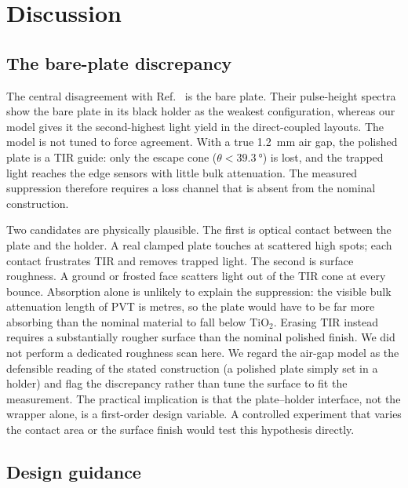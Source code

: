 \documentclass[preprint,12pt]{elsarticle}
\begin{document}
\section{Discussion}
\label{sec:discussion}

\subsection{The bare-plate discrepancy}

The central disagreement with Ref.~\cite{Rao2025} is the bare plate. Their
pulse-height spectra show the bare plate in its black holder as the weakest
configuration, whereas our model gives it the second-highest light yield in the
direct-coupled layouts. The model is not tuned to force agreement. With a true
\SI{1.2}{\milli\meter} air gap, the polished plate is a TIR guide: only the
escape cone ($\theta<\SI{39.3}{\degree}$) is lost, and the trapped light reaches
the edge sensors with little bulk attenuation. The measured suppression
therefore requires a loss channel that is absent from the nominal construction.

Two candidates are physically plausible. The first is optical contact between
the plate and the holder. A real clamped plate touches at scattered high spots;
each contact frustrates TIR and removes trapped light. The second is surface
roughness. A ground or frosted face scatters light out of the TIR cone at every
bounce. Absorption alone is unlikely to explain the suppression: the visible
bulk attenuation length of PVT is metres, so the plate would have to be far
more absorbing than the nominal material to fall below TiO$_2$. Erasing TIR
instead requires a substantially rougher surface than the nominal polished
finish. We did not perform a dedicated roughness scan here. We regard the
air-gap model as the defensible reading of the stated construction (a polished
plate simply set in a holder) and flag the discrepancy rather than tune the
surface to fit the measurement. The practical implication is that the
plate--holder interface, not the wrapper alone, is a first-order design
variable. A controlled experiment that varies the contact area or the surface
finish would test this hypothesis directly.

\subsection{Design guidance}
\end{document}

